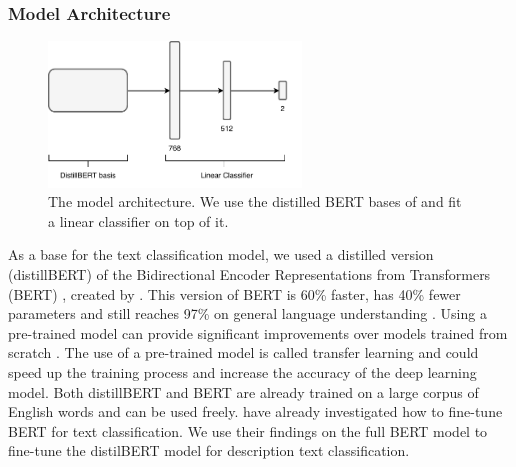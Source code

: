 \documentclass[a4paper, 12pt, oneside]{book} %
\begin{document}
\subsubsection{Model Architecture} \label{par:Architecture}


\begin{figure} [htpb]
    \centering
    \includegraphics[width=0.6\textwidth]{figures/architectureDL.pdf}
    \caption[Model Architecture]{The model architecture. We use the distilled BERT bases of \textcite{sanh_distilbert_2020} and fit a linear classifier on top of it.}
    \label{fig:model_architecture}
\end{figure}

As a base for the text classification model, we used a distilled version (distillBERT) of the Bidirectional Encoder Representations from Transformers (BERT) \autocite{devlin_bert_2019}, created by \textcite{sanh_distilbert_2020}. 
This version of BERT is 60\% faster, has 40\% fewer parameters and still reaches 97\% on general language understanding \autocite{sanh_distilbert_2020}.
Using a pre-trained model can provide significant improvements over models trained from scratch \autocite{mikolov_distributed_2013}.
The use of a pre-trained model is called transfer learning and could speed up the training process and increase the accuracy of the deep learning model.
Both distillBERT and BERT are already trained on a large corpus of English words and can be used freely.
\textcite{sun_how_2020} have already investigated how to fine-tune BERT for text classification.
We use their findings on the full BERT model to fine-tune the distilBERT model for description text classification.
\end{document}
